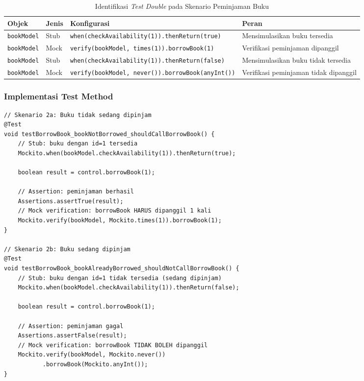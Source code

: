 \documentclass[12pt,a4paper]{article}
\begin{document}
\begin{table}[H]
\centering
\caption{Identifikasi \textit{Test Double} pada Skenario Peminjaman Buku}
\label{tab:stub-mock-borrow}
\begin{tabular}{@{}p{3.5cm}p{2.5cm}p{4.5cm}p{3cm}@{}}
\toprule
\textbf{Objek} & \textbf{Jenis} & \textbf{Konfigurasi} & \textbf{Peran} \\
\midrule
\texttt{bookModel} &
    Stub &
    \texttt{when(checkAvailability(1)).thenReturn(true)} &
    Mensimulasikan buku tersedia \\
\addlinespace
\texttt{bookModel} &
    Mock &
    \texttt{verify(bookModel, times(1)).borrowBook(1)} &
    Verifikasi peminjaman dipanggil \\
\addlinespace
\texttt{bookModel} &
    Stub &
    \texttt{when(checkAvailability(1)).thenReturn(false)} &
    Mensimulasikan buku tidak tersedia \\
\addlinespace
\texttt{bookModel} &
    Mock &
    \texttt{verify(bookModel, never()).borrowBook(anyInt())} &
    Verifikasi peminjaman tidak dipanggil \\
\bottomrule
\end{tabular}
\end{table}

\subsubsection{Implementasi Test Method}

\begin{lstlisting}[caption={Test method peminjaman buku -- dua skenario},
                   label={lst:test-borrow}]
// Skenario 2a: Buku tidak sedang dipinjam
@Test
void testBorrowBook_bookNotBorrowed_shouldCallBorrowBook() {
    // Stub: buku dengan id=1 tersedia
    Mockito.when(bookModel.checkAvailability(1)).thenReturn(true);

    boolean result = control.borrowBook(1);

    // Assertion: peminjaman berhasil
    Assertions.assertTrue(result);
    // Mock verification: borrowBook HARUS dipanggil 1 kali
    Mockito.verify(bookModel, Mockito.times(1)).borrowBook(1);
}

// Skenario 2b: Buku sedang dipinjam
@Test
void testBorrowBook_bookAlreadyBorrowed_shouldNotCallBorrowBook() {
    // Stub: buku dengan id=1 tidak tersedia (sedang dipinjam)
    Mockito.when(bookModel.checkAvailability(1)).thenReturn(false);

    boolean result = control.borrowBook(1);

    // Assertion: peminjaman gagal
    Assertions.assertFalse(result);
    // Mock verification: borrowBook TIDAK BOLEH dipanggil
    Mockito.verify(bookModel, Mockito.never())
           .borrowBook(Mockito.anyInt());
}
\end{lstlisting}
\end{document}
